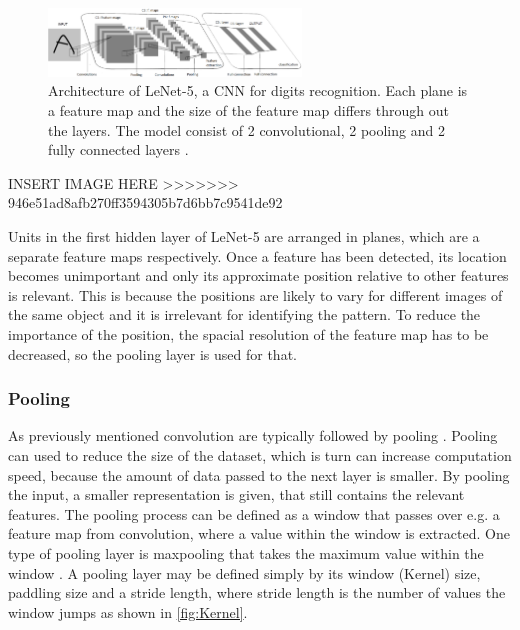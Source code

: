 \begin{figure} [H]
\centering
\includegraphics[width=0.6\textwidth]{figures/LeNet5}
\caption{Architecture of LeNet-5, a CNN for digits recognition. Each plane is a feature map and the size of the feature map differs through out the layers. The model consist of 2 convolutional, 2 pooling and 2 fully connected layers \citep{LeCun1998}.}
\label{fig:LeNet5}  
\end{figure}

\noindent

\noindent
INSERT IMAGE HERE
>>>>>>> 946e51ad8afb270ff3594305b7d6bb7c9541de92


Units in the first hidden layer of LeNet-5 are arranged in planes, which are a separate feature maps respectively. Once a feature has been detected, its location becomes unimportant and only its approximate position relative to other features is relevant. This is because the positions are likely to vary for different images of the same object and it is irrelevant for identifying the pattern. To reduce the importance of the position, the spacial resolution of the feature map has to be decreased, so the pooling layer is used for that.\citep{LeCun1998}



\subsubsection{Pooling}
As previously mentioned convolution are typically followed by pooling \citep{LeCun2015, Goodfellow0216}. 
Pooling can used to reduce the size of the dataset, which is turn can increase computation speed, because the amount of data passed to the next layer is smaller. By pooling the input, a smaller representation is given, that still contains the relevant features.\citep{Goodfellow2016,LeCun1998}     
The pooling process can be defined as a window that passes over e.g. a feature map from convolution, where a value within the window is extracted. One type of pooling layer is maxpooling that takes the maximum value within the window \citep{Goodfellow2016,Dumoulin2016}. A pooling layer may be defined simply by its window (Kernel) size, paddling size and a stride length, where stride length is the number of values the window jumps as shown in \autoref{fig:Kernel}. \citep{Dumoulin2016}


